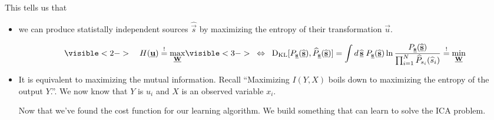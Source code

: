 \begin{frame}


\pause

This tells us that 
\begin{itemize}
\item we can produce statistally independent sources $\widehat {\vec s}$ 
by maximizing the entropy of their transformation $\vec u$.

\begingroup
\footnotesize
\begin{equation}
\label{eq:klminequivh}
\visible<2->{
 \quad H(\vec u) \eqexcl \max_{\vec W} 
 }
 \visible<3->{
  \;\; \Leftrightarrow \;\;
 	\dkl\lbrack P_{\vec{s}}(\widehat{\vec{s}}),\widehat{P}_{\vec{s}}(\widehat{\vec{s}})\rbrack = 
    \int d \, \widehat{\vec{s}} \; P_{\vec{s}}(\widehat{\vec{s}})
		\ln \frac{P_{\vec{s}}(\widehat{\vec{s}})}{
			\prod_{i = 1}^N \widehat{P}_{s_i}(\widehat{s}_i) }
		\eqexcl \min_{\vec{W}} 
 }
\end{equation}
\endgroup
\pause

\item It is equivalent to maximizing the mutual information.
Recall ``Maximizing $I(Y,X)$ boils down to maximizing the entropy of the output $Y$.''.
We now know that $Y$ is $u_i$ and $X$ is an observed variable $x_i$.

\pause

Now that we've found the cost function for our learning algorithm. 
We build something that can learn to solve the ICA problem.

\end{itemize}

\end{frame}

